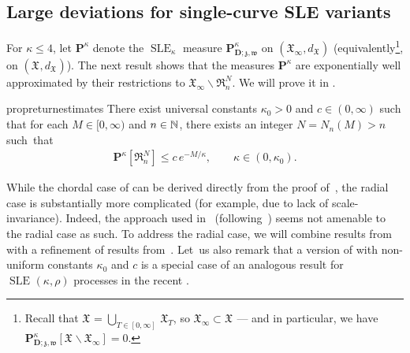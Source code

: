 \documentclass[a4paper, 11pt]{article}
\theoremstyle{definition}
\numberwithin{equation}{section}
\numberwithin{figure}{section}
\newcommand{\SLE}[1][]{\operatorname{SLE}_{#1}}
\newcommand{\Xpaths}[1][]{\mathfrak{X}_{#1}}
\newcommand{\dXpaths}[1][]{d_{\Xpaths[#1]}}
\newcommand{\Ddomain}{\mathbf{D}}
\newcommand{\targetpoint}{\mathfrak{w}}
\newcommand{\beginpoint}{\mathfrak{z}}
\newcommand{\SLEmeasure}[2]{\mathbf{P}^{#2}_{\!\!#1}}
\newcommand{\XmeasureReference}[1]{{\mathbf P}^{#1}}
\newcommand{\xreturnevent}[2]{\mathfrak{R}_{#1}^{#2}}
\begin{document}
\subsection{Large deviations for single-curve SLE variants}\label{subsec:radialLDP}

For $\kappa \leq 4$, let $\XmeasureReference{\kappa}$ denote the $\SLE[\kappa]$ measure $\SLEmeasure{\Ddomain;\beginpoint,\targetpoint}{\kappa}$ on $(\Xpaths[\infty],\dXpaths)$ (equivalently\footnote{\label{fn:zeroset}Recall that $\Xpaths = \underset{T \in [0,\infty]}{\bigcup} \, \Xpaths[T]$,
so $\Xpaths[\infty] \subset \Xpaths$ --- and in particular, we have
$\SLEmeasure{\Ddomain;\beginpoint,\targetpoint}{\kappa}[\Xpaths \smallsetminus \Xpaths[\infty]] = 0$.}, on $(\Xpaths,\dXpaths)$). 
The next result shows that the measures $\XmeasureReference{\kappa}$ are
exponentially well approximated by their restrictions to $\Xpaths[\infty] \smallsetminus \xreturnevent{n}{N}$. 
We will prove it in .


\begin{restatable}{prop}{returnestimates}\label{thm:return-estimates}
There exist universal constants $\kappa_0 > 0$ and $c \in (0,\infty)$ such that 
for each $M \in [0,\infty)$ 
and $n \in \mathbb{N}$, there exists an integer $N = N_n(M) > n$ such~that 
\begin{align}\label{eq:return-estimates}
\SLEmeasure{}{\kappa}[\xreturnevent{n}{N}] \le c \, e^{-M/\kappa} , \qquad \kappa \in (0,\kappa_0).
\end{align}
\end{restatable}

While the chordal case of  can be derived directly from the proof of~\cite[Corollary~A.4]{Peltola-Wang:LDP}, 
the radial case is substantially more complicated (for example, due to lack of scale-invariance). 
Indeed, the approach used in~\cite[Appendix~A]{Peltola-Wang:LDP} (following~\cite{Lawler:Minkowski_content_of_intersection_of_SLE_curve_with_real_line})
seems not amenable to the radial case as such. 
To address the radial case, we will combine results from~\cite[Appendix~A]{Peltola-Wang:LDP} 
with a refinement of results from~\cite{Lawler:Continuity_of_radial_and_two-sided_radial_SLE_at_the_terminal_point, Field-Lawler:Escape_probability_and_transience_for_SLE}. 
Let~us also remark that a version of  with non-uniform constants $\kappa_0$ and $c$ is a special case of an analogous result for $\SLE(\kappa, \rho)$ processes in the recent \cite{Krusell:in_prep}.
\end{document}
